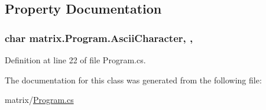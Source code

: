 \subsection{Property Documentation}
\hypertarget{classmatrix_1_1_program_ae4f0df2b9f302e657820ea236f831664}{
\subsubsection[{Ascii\-Character}]{\setlength{\rightskip}{0pt plus 5cm}char matrix.\-Program.\-Ascii\-Character\hspace{0.3cm}{\ttfamily [static]}, {\ttfamily [get]}, {\ttfamily [private]}}}\label{classmatrix_1_1_program_ae4f0df2b9f302e657820ea236f831664}


Definition at line 22 of file Program.\-cs.



The documentation for this class was generated from the following file\-:\begin{DoxyCompactItemize}
\item 
matrix/\hyperlink{matrix_2_program_8cs}{Program.\-cs}\end{DoxyCompactItemize}
